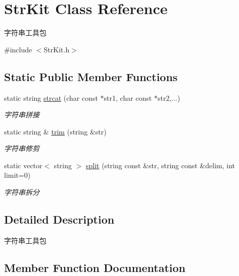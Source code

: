 \hypertarget{class_str_kit}{}\section{Str\+Kit Class Reference}
\label{class_str_kit}


字符串工具包  




{\ttfamily \#include $<$Str\+Kit.\+h$>$}

\subsection*{Static Public Member Functions}
\begin{DoxyCompactItemize}
\item 
static string \hyperlink{class_str_kit_a7d9fff4cf9f64dc5abdf98ce32459e57}{strcat} (char const $\ast$str1, char const $\ast$str2,...)
\begin{DoxyCompactList}\small\item\em 字符串拼接 \end{DoxyCompactList}\item 
static string \& \hyperlink{class_str_kit_a562291e7c2bd405694de39f208b311da}{trim} (string \&str)
\begin{DoxyCompactList}\small\item\em 字符串修剪 \end{DoxyCompactList}\item 
static vector$<$ string $>$ \hyperlink{class_str_kit_a3546933e78dddcef98e7e17fd3a3a442}{split} (string const \&str, string const \&delim, int limit=0)
\begin{DoxyCompactList}\small\item\em 字符串拆分 \end{DoxyCompactList}\end{DoxyCompactItemize}


\subsection{Detailed Description}
字符串工具包 

\subsection{Member Function Documentation}
\mbox{\label{class_str_kit_a3546933e78dddcef98e7e17fd3a3a442}} 
